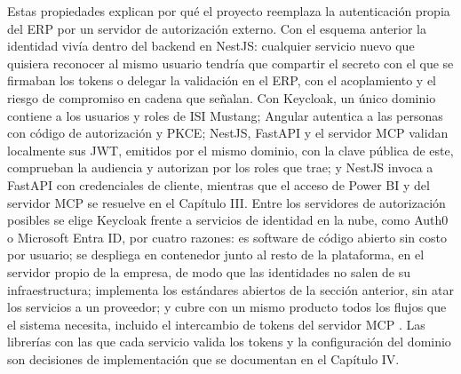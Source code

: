 Estas propiedades explican por qué el proyecto reemplaza la autenticación propia del ERP por un servidor de autorización externo. Con el esquema anterior la identidad vivía dentro del backend en NestJS: cualquier servicio nuevo que quisiera reconocer al mismo usuario tendría que compartir el secreto con el que se firmaban los tokens o delegar la validación en el ERP, con el acoplamiento y el riesgo de compromiso en cadena que \textcite{Almeida2022} señalan. Con Keycloak, un único dominio contiene a los usuarios y roles de ISI Mustang; Angular autentica a las personas con código de autorización y PKCE; NestJS, FastAPI y el servidor MCP validan localmente sus JWT, emitidos por el mismo dominio, con la clave pública de este, comprueban la audiencia y autorizan por los roles que trae; y NestJS invoca a FastAPI con credenciales de cliente, mientras que el acceso de Power BI y del servidor MCP se resuelve en el Capítulo III\@. Entre los servidores de autorización posibles se elige Keycloak frente a servicios de identidad en la nube, como Auth0 o Microsoft Entra ID, por cuatro razones: es software de código abierto sin costo por usuario; se despliega en contenedor junto al resto de la plataforma, en el servidor propio de la empresa, de modo que las identidades no salen de su infraestructura; implementa los estándares abiertos de la sección anterior, sin atar los servicios a un proveedor; y cubre con un mismo producto todos los flujos que el sistema necesita, incluido el intercambio de tokens del servidor MCP \parencite{KeycloakTokenExchange}. Las librerías con las que cada servicio valida los tokens y la configuración del dominio son decisiones de implementación que se documentan en el Capítulo IV\@.
